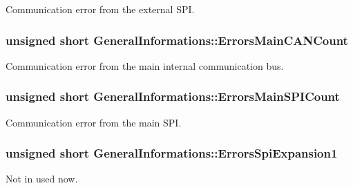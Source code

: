 Communication error from the external S\+PI. 

\subsubsection[{\texorpdfstring{Errors\+Main\+C\+A\+N\+Count}{ErrorsMainCANCount}}]{\setlength{\rightskip}{0pt plus 5cm}unsigned short General\+Informations\+::\+Errors\+Main\+C\+A\+N\+Count}\hypertarget{struct_general_informations_aa2ae45e90dae092075b4662268757868}{}\label{struct_general_informations_aa2ae45e90dae092075b4662268757868}


Communication error from the main internal communication bus. 

\subsubsection[{\texorpdfstring{Errors\+Main\+S\+P\+I\+Count}{ErrorsMainSPICount}}]{\setlength{\rightskip}{0pt plus 5cm}unsigned short General\+Informations\+::\+Errors\+Main\+S\+P\+I\+Count}\hypertarget{struct_general_informations_a810315cbb3a170f9a1124e52cc22d59c}{}\label{struct_general_informations_a810315cbb3a170f9a1124e52cc22d59c}


Communication error from the main S\+PI. 

\subsubsection[{\texorpdfstring{Errors\+Spi\+Expansion1}{ErrorsSpiExpansion1}}]{\setlength{\rightskip}{0pt plus 5cm}unsigned short General\+Informations\+::\+Errors\+Spi\+Expansion1}\hypertarget{struct_general_informations_a81b7dea1c9cbcbc985eca648a8c5075c}{}\label{struct_general_informations_a81b7dea1c9cbcbc985eca648a8c5075c}


Not in used now. 

